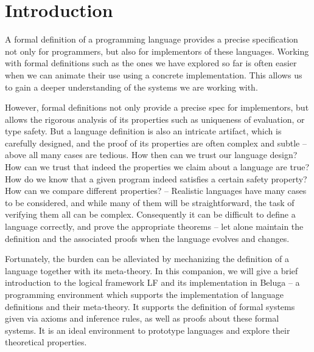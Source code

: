 \chapter{Introduction}


A formal definition of a programming language
provides a precise specification not only for programmers, but also
for implementors of these languages. Working with formal definitions such as the
ones we have explored so far is often easier when we can animate their use using
a concrete implementation. This allows us to gain a deeper understanding of the
systems we are working with.

However, formal definitions not only provide a precise spec for implementors,
but allows the rigorous analysis of its properties such as uniqueness of
evaluation, or type safety. But a language definition is also an
intricate artifact, which is carefully designed, and the proof of its
properties are often complex and subtle --  above all many cases are
tedious. How then can we trust our language design? How can we trust
that indeed the properties we claim about a language are true? How do
we know that a given program indeed satisfies a certain safety
property? How can we compare different properties? --  
%
Realistic languages have many cases to be considered, and while many
of them will be straightforward, the task of verifying them all can
be complex. Consequently it can be difficult to define a language
correctly, and prove the appropriate theorems -- let alone maintain
the definition and the associated proofs when the language evolves and
changes.  

Fortunately, the burden can be alleviated by mechanizing the
definition of a language together with its meta-theory. In this companion,
we will give a brief introduction to the logical framework LF \citep{Harper93jacm} and its
implementation in Beluga \citep{Pientka:POPL08,Pientka:PPDP08,Pientka:IJCAR10,Cave:POPL12} -- a programming environment which
supports the implementation of language definitions and their
meta-theory. It supports the definition of formal systems given via
axioms and inference rules, as well as proofs about these formal
systems. It is an ideal environment to prototype languages and explore their
theoretical properties. %


